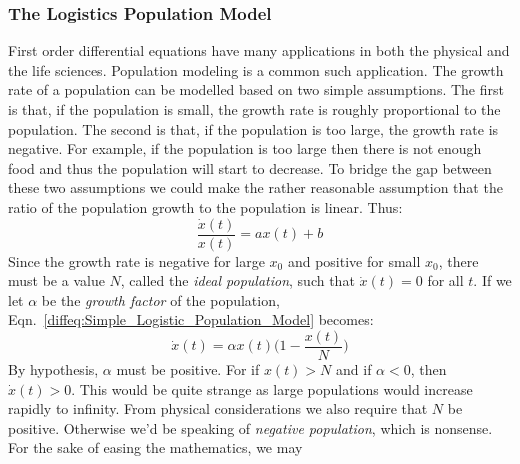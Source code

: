             \subsubsection{The Logistics Population Model}
                First order differential equations have many
                applications in both the physical and the life
                sciences. Population modeling is a common such
                application. The growth rate of a population can
                be modelled based on two simple assumptions. The
                first is that, if the population is small, the
                growth rate is roughly proportional to the population.
                The second is that, if the population is too large,
                the growth rate is negative. For example, if the
                population is too large then there is not enough food
                and thus the population will start to decrease.
                To bridge the gap between these two assumptions
                we could make the rather reasonable assumption
                that the ratio of the population growth to the
                population is linear. Thus:
                \begin{equation}
                    \label{diffeq:Simple_Logistic_Population_Model}
                    \frac{\dot{x}(t)}{x(t)}=ax(t)+b
                \end{equation}
                Since the growth rate is negative for large
                $x_{0}$ and positive for small $x_{0}$, there
                must be a value $N$, called the
                \textit{ideal population}, such that
                $\dot{x}(t)=0$ for all $t$. If we let $\alpha$ be
                the \textit{growth factor} of the population,
                Eqn.~\ref{diffeq:Simple_Logistic_Population_Model}
                becomes:
                \begin{equation}
                    \label{diffeq:Logistics_Population_Model_DE}
                    \dot{x}(t)=\alpha{x}(t)\big(1-\frac{x(t)}{N}\big)
                \end{equation}
                By hypothesis, $\alpha$ must be positive. For
                if $x(t)>N$ and if $\alpha<0$, then
                $\dot{x}(t)>0$. This would be quite strange as
                large populations would increase rapidly to infinity.
                From physical considerations we also require that
                $N$ be positive. Otherwise we'd be speaking of
                \textit{negative population}, which is nonsense.
                For the sake of easing the mathematics, we may
